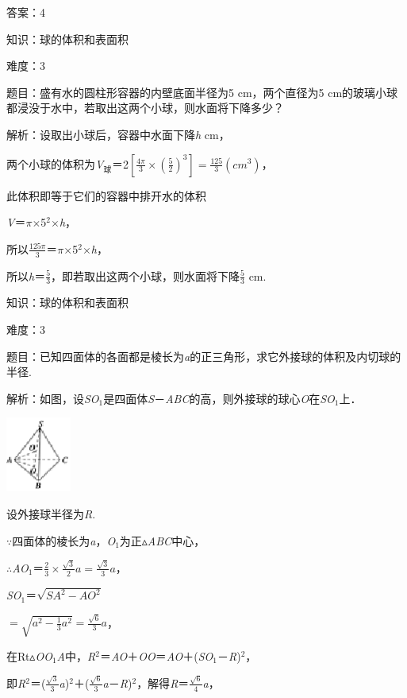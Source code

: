 \documentclass{article} %
\begin{document}
答案：4

知识：球的体积和表面积

难度：3

题目：盛有水的圆柱形容器的内壁底面半径为5 cm，两个直径为5 cm的玻璃小球都浸没于水中，若取出这两个小球，则水面将下降多少？

解析：设取出小球后，容器中水面下降\textit{h} cm，

两个小球的体积为\textit{V}${}_{\textrm{球}}$＝2$[\frac{4\pi}{3}\times (\frac{5}{2})^3]=\frac{125}{3}(cm^3)$，

此体积即等于它们的容器中排开水的体积

\textit{V}＝$\pi$$\mathrm{\times}$5${}^{2}$$\mathrm{\times}$\textit{h}，

所以$\frac{125\pi}{3}$＝$\pi$$\mathrm{\times}$5${}^{2}$$\mathrm{\times}$\textit{h}，

所以\textit{h}＝$\frac{5}{3}$，即若取出这两个小球，则水面将下降$\frac{5}{3}$ cm.

知识：球的体积和表面积

难度：3

题目：已知四面体的各面都是棱长为\textit{a}的正三角形，求它外接球的体积及内切球的半径.



解析：如图，设\textit{SO}${}_{1}$是四面体\textit{S}－\textit{ABC}的高，则外接球的球心\textit{O}在\textit{SO}${}_{1}$上．

\includegraphics*[width=0.85in, height=0.97in, keepaspectratio=false]{image83}

设外接球半径为\textit{R}.

$\mathrm{\because}$四面体的棱长为\textit{a}，\textit{O}${}_{1}$为正$\mathrm{\vartriangle}$\textit{ABC}中心，

$\mathrm{\therefore}$\textit{AO}${}_{1}$＝$\frac{2}{3}\times\frac{\sqrt{3}}{2}a=\frac{\sqrt{3}}{3}a$，

\textit{SO}${}_{1}$＝$\sqrt{SA^2-AO^2}$

$=\sqrt{a^2-\frac{1}{3}a^2}=\frac{\sqrt{6}}{3}a$，

在Rt$\mathrm{\vartriangle}$\textit{OO}${}_{1}$\textit{A}中，\textit{R}${}^{2}$＝\textit{AO}＋\textit{OO}＝\textit{AO}＋(\textit{SO}${}_{1}$－\textit{R})${}^{2}$，

即\textit{R}${}^{2}$＝($\frac{\sqrt{3}}{3}$\textit{a})${}^{2}$＋($\frac{\sqrt{6}}{3}$\textit{a}－\textit{R})${}^{2}$，解得\textit{R}＝$\frac{\sqrt{6}}{4}$\textit{a}，
\end{document}
